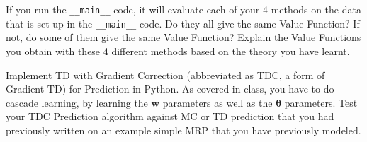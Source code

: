 \documentclass[12pt]{exam}
\begin{document}
\begin{questions}
If you run the \lstinline{__main__} code, it will evaluate each of your 4 methods on the data that is set up in the \lstinline{__main__} code. Do they all give the same Value Function? If not, do some of them give the same Value Function? Explain the Value Functions you obtain with these 4 different methods based on the theory you have learnt.

 Implement TD with Gradient Correction (abbreviated as TDC, a form of Gradient TD) for Prediction in Python. As covered in class, you have to do cascade learning, by learning the $\bm{w}$ parameters as well as the $\bm{\theta}$ parameters. Test your TDC Prediction algorithm against MC or TD prediction that you had previously written on an example simple MRP that you have previously modeled.

\end{questions}
\end{document}
